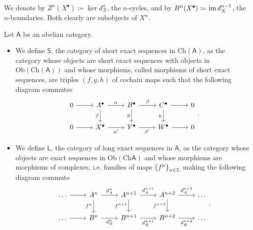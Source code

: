 \begin{rem}[Notation]
	We denote by $Z^n(X^\bullet) \coloneqq \ker d_X^n$, the $n$-cycles,
	and by $B^n(X^\bullet) \coloneqq \operatorname{im} d_X^{n-1}$, the $n$-boundaries.
	Both clearly are subobjects of $X^n$.
\end{rem}

\begin{defn}
	Let $\mathsf{A}$ be an abelian category.
	\begin{itemize}
		\item We define $\mathsf{S}$, the category of short exact sequences
	in $\mathrm{Ch}(\mathsf{A})$, as the category whose objects
	are short exact sequences with objects in $\mathrm{Ob} \left(\mathrm{Ch}(\mathsf{A})\right)$
	and whose morphisms, called morphisms of short exact sequences,
	are triples $(f,g,h)$ of cochain maps such that
	the following diagram commutes
	\begin{equation}
	\begin{tikzcd}
		0 \arrow[r, "", rightarrow] &
		A^\bullet \arrow[r, "\alpha", rightarrow] \arrow[d, "f"', rightarrow] &
		B^\bullet \arrow[r, "\beta", rightarrow] \arrow[d, "g"', rightarrow] &
		C^\bullet \arrow[r, "", rightarrow] \arrow[d, "h"', rightarrow] &
		0 \\
		0 \arrow[r, "", rightarrow] &
		X^\bullet \arrow[r, "\alpha'"', rightarrow] &
		Y^\bullet \arrow[r, "\beta'"', rightarrow] &
		W^\bullet \arrow[r, "", rightarrow] &
		0 
	\end{tikzcd}
	.\end{equation} 
		\item We define $\mathsf{L}$, the category of long exact sequences
	in $\mathsf{A}$, as the category whose objects
	are exact sequences in $\mathrm{Ob} \left(\mathrm{Ch}\mathsf{A}\right)$
	and whose morphisms are morphisms of complexes, i.e.
	families of maps $\left\{ f^n \right\}_{n \in \mathbb{Z}}$ making
	the following diagram commute
	\begin{equation}
	\begin{tikzcd}
		\ldots \arrow[r, "", rightarrow] &
		A^n \arrow[r, "d_A^n", rightarrow] \arrow[d, "f^n"', rightarrow] &
		A^{n+1} \arrow[r, "d_A^{n+1}", rightarrow] \arrow[d, "f^{n+1}"', rightarrow] &
		A^{n+2} \arrow[r, "d_A^{n+2}", rightarrow] \arrow[d, "f^{n+2}"', rightarrow] &
		\ldots \\
		\ldots \arrow[r, "", rightarrow] &
		B^n \arrow[r, "d_B^n"', rightarrow] &
		B^{n+1} \arrow[r, "d_B^{n+1}"', rightarrow] &
		B^{n+2} \arrow[r, "d_B^{n+2}"', rightarrow] &
		\ldots 
	\end{tikzcd}
	.\end{equation} 
	\end{itemize}
\end{defn}

